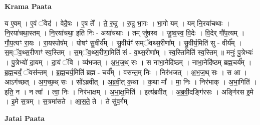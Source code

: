\documentclass[17pt]{extarticle}
\begin{document}
\textbf{Krama Paata} \newline

य ए॒वम् । ए॒वं ॅवेद॑ । वेदै॒षः । ए॒ष ते᳚ । ते॒ रु॒द्र॒ । रु॒द्र॒ भा॒गः । भा॒गो यम् । यम् नि॒रया॑चथाः । नि॒रया॑चथा॒स्तम् । नि॒रया॑चथा॒ इति॑ निः - अया॑चथाः । तम् जु॑षस्व । जु॒ष्व॒स्व॒ वि॒देः । वि॒देर् गौ॑प॒त्यम् । गौ॒प॒त्यꣳ रा॒यः । रा॒यस्पोष᳚म् । पोषꣳ॑ सु॒वीर्य᳚म् । सु॒वीर्यꣳ॑ सम्ॅवथ्स॒रीणा᳚म् । सु॒वीर्य॒मिति॑ सु - वीर्य᳚म् । स॒म्ॅव॒थ्स॒रीणाꣳ॑ स्व॒स्तिम् । स॒म्ॅव॒थ्स॒रीणा॒मिति॑ सं - व॒थ्स॒रीणा᳚म् । स्व॒स्तिमिति॑ स्व॒स्तिम् ॥ मनुः॑ पु॒त्रेभ्यः॑ । पु॒त्रेभ्यो॑ दा॒यम् । दा॒यं ॅवि । व्य॑भजत् । अ॒भ॒ज॒थ् सः । स नाभा॒नेदि॑ष्ठम् । नाभा॒नेदि॑ष्ठम् ब्रह्म॒चर्य᳚म् । ब्र॒ह्म॒चर्यं॒ ॅवस॑न्तम् । ब्र॒ह्म॒चर्य॒मिति॑ ब्रह्म - चर्य᳚म् । वस॑न्त॒म् निः । निर॑भजत् । अ॒भ॒ज॒थ् सः । स आ । आऽग॑च्छत् । अ॒ग॒च्छ॒थ् सः । सो᳚ऽब्रवीत् । अ॒ब्र॒वी॒त् क॒था । क॒था मा᳚ । मा॒ निः । निर॑भाक् । अ॒भा॒गिति॑ । इति॒ न । न त्वा᳚ । त्वा॒ निः । निर॑भाक्षम् । अ॒भा॒क्ष॒मिति॑ । इत्य॑ब्रवीत् । अ॒ब्र॒वी॒दङ्गि॑रसः । अङ्गि॑रस इ॒मे । इ॒मे स॒त्रम् । स॒त्रमा॑सते । आ॒स॒ते॒ ते । ते सु॑व॒र्गम् \newline

\textbf{Jatai Paata} \newline
\end{document}
